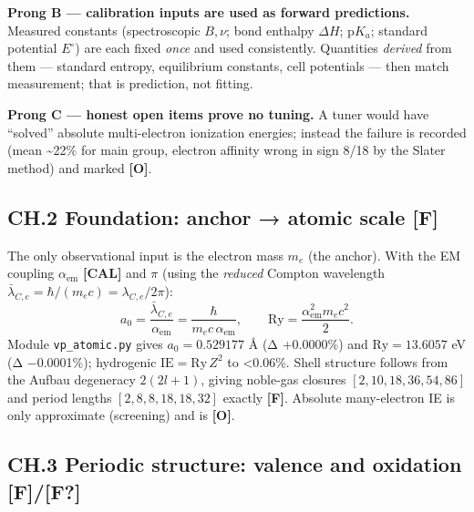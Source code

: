 \documentclass[
  10pt,
]{article}
\begin{document}
\textbf{Prong B --- calibration inputs are used as forward predictions.}
Measured constants (spectroscopic \(B,\nu\); bond enthalpy \(\Delta H\);
\(\mathrm pK_a\); standard potential \(E^\circ\)) are each fixed
\emph{once} and used consistently. Quantities \emph{derived} from them
--- standard entropy, equilibrium constants, cell potentials --- then
match measurement; that is prediction, not fitting.

\textbf{Prong C --- honest open items prove no tuning.} A tuner would
have ``solved'' absolute multi-electron ionization energies; instead the
failure is recorded (mean \textasciitilde22\% for main group, electron
affinity wrong in sign 8/18 by the Slater method) and marked
\textbf{{[}O{]}}.

\hypertarget{ch.2-foundation-anchor-atomic-scale-f}{%
\subsection{\texorpdfstring{CH.2 Foundation: anchor → atomic scale
\textbf{{[}F{]}}}{CH.2 Foundation: anchor → atomic scale {[}F{]}}}\label{ch.2-foundation-anchor-atomic-scale-f}}

The only observational input is the electron mass \(m_e\) (the anchor).
With the EM coupling \(\alpha_{\mathrm{em}}\) \textbf{{[}CAL{]}} and
\(\pi\) (using the \emph{reduced} Compton wavelength
\(\bar\lambda_{C,e} = \hbar/(m_e c) = \lambda_{C,e}/2\pi\)):
\[ a_0 = \frac{\bar\lambda_{C,e}}{\alpha_{\mathrm{em}}} = \frac{\hbar}{m_e c\,\alpha_{\mathrm{em}}},
   \qquad \mathrm{Ry} = \frac{\alpha_{\mathrm{em}}^2 m_e c^2}{2}. \]
Module \texttt{vp\_atomic.py} gives \(a_0 = 0.529177\) Å (Δ +0.0000\%)
and \(\mathrm{Ry} = 13.6057\) eV (Δ −0.0001\%); hydrogenic
\(\mathrm{IE} = \mathrm{Ry}\,Z^2\) to \textless0.06\%. Shell structure
follows from the Aufbau degeneracy \(2(2l+1)\), giving noble-gas
closures \([2,10,18,36,54,86]\) and period lengths \([2,8,8,18,18,32]\)
exactly \textbf{{[}F{]}}. Absolute many-electron IE is only approximate
(screening) and is \textbf{{[}O{]}}.

\hypertarget{ch.3-periodic-structure-valence-and-oxidation-ff}{%
\subsection{\texorpdfstring{CH.3 Periodic structure: valence and
oxidation
\textbf{{[}F{]}/{[}F?{]}}}{CH.3 Periodic structure: valence and oxidation {[}F{]}/{[}F?{]}}}\label{ch.3-periodic-structure-valence-and-oxidation-ff}}
\end{document}
